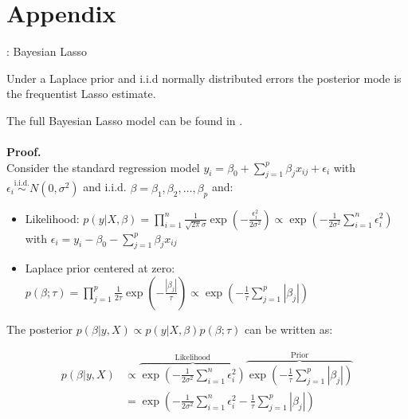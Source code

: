 \section*{Appendix}
\label{sec:appendix}

\begin{frame}[allowframebreaks]{: Bayesian Lasso}
    \begin{theorem}
        Under a Laplace prior and i.i.d normally distributed errors the posterior mode is the frequentist Lasso estimate.
    \end{theorem}

    The full Bayesian Lasso model can be found in \cite{park_bayesian_2008}.\\~\\

    \textbf{Proof.}\\
    Consider the standard regression model $y_i = \beta_0 + \sum_{j = 1}^{p} \beta_j x_{ij} + \epsilon_i$ with $\epsilon_i \overset{\text{i.i.d.}}{\sim} N(0, \sigma^2)$ and i.i.d. $\beta = \beta_1 , \beta_2 , \dots , \beta_p$ and:

    \begin{itemize}
        \small
        \item Likelihood: $p(y|X,\beta) = \prod_{i = 1}^{n} \frac{1}{\sqrt{2 \pi} \sigma} \exp \left( - \frac{\epsilon_i^2}{2 \sigma^2} \right) \propto \exp \left( - \frac{1}{2 \sigma^2} \sum_{i = 1}^{n} \epsilon_i^2 \right)$ with $\epsilon_i = y_i - \beta_0 - \sum_{j = 1}^{p} \beta_j x_{ij}$
        \item Laplace prior centered at zero: $p(\beta;\tau) = \prod_{j = 1}^{p} \frac{1}{2\tau} \exp \left( - \frac{|\beta_j|}{\tau} \right) \propto \exp \left( - \frac{1}{\tau} \sum_{j = 1}^{p} |\beta_j| \right)$
    \end{itemize}

    The posterior $p(\beta|y,X) \propto p(y|X,\beta) p(\beta;\tau)$ can be written as:

    \begin{align*}
        p(\beta|y,X) & \propto\overbrace{\exp \left( - \frac{1}{2 \sigma^2} \sum_{i = 1}^{n} \epsilon_i^2 \right)}^{\text{Likelihood}} \overbrace{\exp \left( - \frac{1}{\tau} \sum_{j = 1}^{p} |\beta_j| \right)}^{\text{Prior}} \\
                     & = \exp \left( - \frac{1}{2 \sigma^2} \sum_{i = 1}^{n} \epsilon_i^2 - \frac{1}{\tau} \sum_{j = 1}^{p} |\beta_j| \right)
    \end{align*}


\end{frame}
